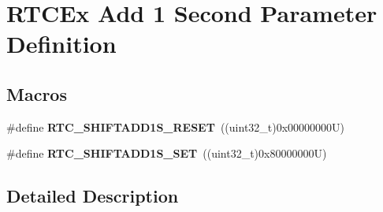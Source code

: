 \hypertarget{group___r_t_c_ex___add__1___second___parameter___definition}{}\section{R\+T\+C\+Ex Add 1 Second Parameter Definition}
\label{group___r_t_c_ex___add__1___second___parameter___definition}
\subsection*{Macros}
\begin{DoxyCompactItemize}
\item 
\mbox{\label{group___r_t_c_ex___add__1___second___parameter___definition_gaadc96f8fbcb4a576dc126c8a78476864}} 
\#define {\bfseries R\+T\+C\+\_\+\+S\+H\+I\+F\+T\+A\+D\+D1\+S\+\_\+\+R\+E\+S\+ET}~((uint32\+\_\+t)0x00000000\+U)
\item 
\mbox{\label{group___r_t_c_ex___add__1___second___parameter___definition_gac22d753caa7eae6b1f4564eba3727900}} 
\#define {\bfseries R\+T\+C\+\_\+\+S\+H\+I\+F\+T\+A\+D\+D1\+S\+\_\+\+S\+ET}~((uint32\+\_\+t)0x80000000\+U)
\end{DoxyCompactItemize}


\subsection{Detailed Description}
